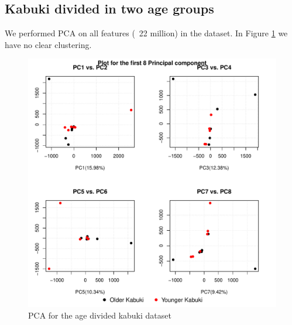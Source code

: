 \subsection{Kabuki divided in two age groups}
We performed PCA on all features (~22 million) in the dataset. In Figure \ref{fig:oldyoung-pca} we have no clear clustering.
\begin{figure}[!h]
    \centering
    \includegraphics[width=\textwidth]{figures/PCA/old_young/pca_plot.pdf}
    \caption{PCA for the age divided kabuki dataset}
    \label{fig:oldyoung-pca}
\end{figure}

